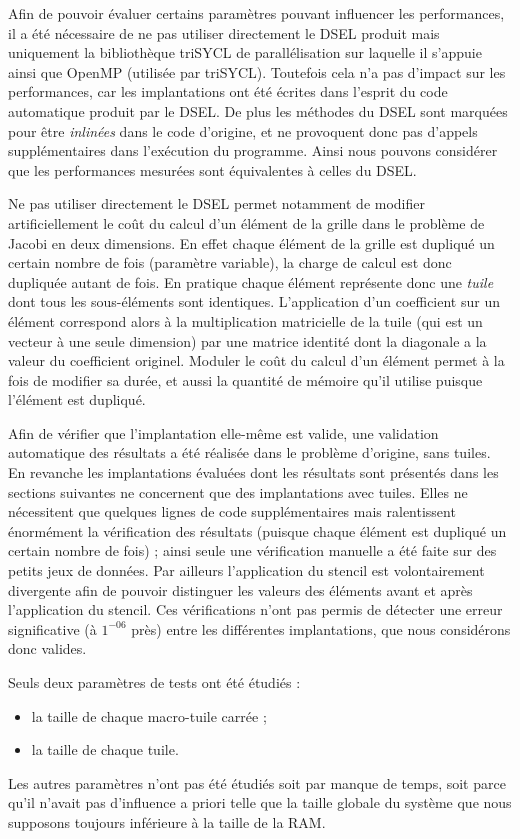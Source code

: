 Afin de pouvoir évaluer certains paramètres pouvant influencer les performances, il a été nécessaire de ne pas utiliser directement le DSEL produit mais uniquement la bibliothèque \textsf{triSYCL} de parallélisation sur laquelle il s'appuie ainsi que \textsf{OpenMP} (utilisée par \textsf{triSYCL}). Toutefois cela n'a pas d'impact sur les performances, car les implantations ont été écrites dans l'esprit du code automatique produit par le DSEL. De plus les méthodes du DSEL sont marquées pour être \emph{inlinées} dans le code d'origine, et ne provoquent donc pas d'appels supplémentaires dans l'exécution du programme. Ainsi nous pouvons considérer que les performances mesurées sont équivalentes à celles du DSEL.

Ne pas utiliser directement le DSEL permet notamment de modifier artificiellement le coût du calcul d'un élément de la grille dans le problème de Jacobi en deux dimensions. En effet chaque élément de la grille est dupliqué un certain nombre de fois (paramètre variable), la charge de calcul est donc dupliquée autant de fois. En pratique chaque élément représente donc une \emph{tuile} dont tous les sous-éléments sont identiques. L'application d'un coefficient sur un élément correspond alors à la multiplication matricielle de la tuile (qui est un vecteur à une seule dimension) par une matrice identité dont la diagonale a la valeur du coefficient originel. Moduler le coût du calcul d'un élément permet à la fois de modifier sa durée, et aussi la quantité de mémoire qu'il utilise puisque l'élément est dupliqué.

Afin de vérifier que l'implantation elle-même est valide, une validation automatique des résultats a été réalisée dans le problème d'origine, sans tuiles. En revanche les implantations évaluées dont les résultats sont présentés dans les sections suivantes ne concernent que des implantations avec tuiles. Elles ne nécessitent que quelques lignes de code supplémentaires mais ralentissent énormément la vérification des résultats (puisque chaque élément est dupliqué un certain nombre de fois) ; ainsi seule une vérification manuelle a été faite sur des petits jeux de données. Par ailleurs l'application du stencil est volontairement divergente afin de pouvoir distinguer les valeurs des éléments avant et après l'application du stencil. Ces vérifications n'ont pas permis de détecter une erreur significative (à $1^{-06}$ près) entre les différentes implantations, que nous considérons donc valides. 

Seuls deux paramètres de tests ont été étudiés :
\begin{itemize}
\item la taille de chaque macro-tuile carrée ;
\item la taille de chaque tuile.
\end{itemize}
Les autres paramètres n'ont pas été étudiés soit par manque de temps, soit parce qu'il n'avait pas d'influence a priori telle que la taille globale du système que nous supposons toujours inférieure à la taille de la RAM.

